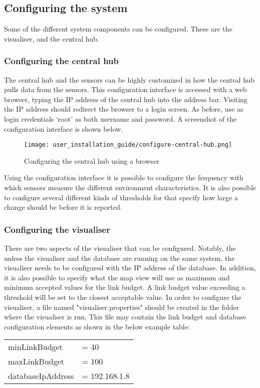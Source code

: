 \documentclass[../document.tex]{subfiles}
\begin{document}
\subsection{Configuring the system}
Some of the different system components can be configured. These are the visualiser, and the central hub.

\subsubsection{Configuring the central hub}
The central hub and the sensors can be highly customized in how the central hub pulls data from the sensors. This configuration interface is accessed with a web browser, typing the IP address of the central hub into the address bar. Visiting the IP address should redirect the browser to a login screen. As before, use as login credentials ‘root’ as both username and password. A screenshot of the configuration interface is shown below.
\begin{figure}[H]\caption{Configuring the central hub using a browser}
	\centering
	\texttt{[image: user\_installation\_guide/configure-central-hub.png]}
\end{figure}

Using the configuration interface it is possible to configure the frequency with which sensors measure the different environment characteristics. It is also possible to configure several different kinds of thresholds for that specify how large a change should be before it is reported.

\subsubsection{Configuring the visualiser}
There are two aspects of the visualiser that can be configured. Notably, the unless the visualiser and the database are running on the same system, the visualiser needs to be configured with the IP address of the database. In addition, it is also possible to specify what the map view will use as maximum and minimum accepted values for the link budget. A link budget value exceeding a threshold will be set to the closest acceptable value. In order to configure the visualiser, a file named "visualiser.properties" should be created in the folder where the visualiser is run. This file may contain the link budget and database configuration elements as shown in the below example table:
\begin{table}[H]
	\centering
	\ttfamily
	\begin{tabular}{|ll|}\hline
		minLinkBudget &= 40		\\
		maxLinkBudget &= 100	\\
		databaseIpAddress &= 192.168.1.8	\\\hline
	\end{tabular}
\end{table}
\end{document}
